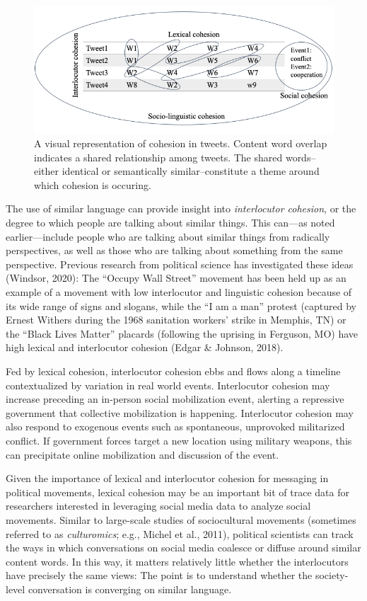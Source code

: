 \documentclass[english,man]{apa6}
\begin{document}
\begin{figure}
\includegraphics[width=1\linewidth]{./figs/cohesion-in-tweets} \caption{A visual representation of cohesion in tweets. Content word overlap indicates a shared relationship among tweets. The shared words--either identical or semantically similar--constitute a theme around which cohesion is occuring.}\label{fig:cohesion-in-tweets}
\end{figure}

The use of similar language can provide insight into \emph{interlocutor cohesion}, or
the degree to which people are talking about similar things. This can---as noted
earlier---include people who are talking about similar things from radically
perspectives, as well as those who are talking about something from the same
perspective. Previous research from political science has investigated these
ideas (Windsor, 2020): The \enquote{Occupy Wall Street} movement has been held up as an
example of a movement with low interlocutor and linguistic cohesion because of
its wide range of signs and slogans, while the \enquote{I am a man} protest (captured by
Ernest Withers during the 1968 sanitation workers' strike in Memphis, TN) or the
\enquote{Black Lives Matter} placards (following the uprising in Ferguson, MO) have high
lexical and interlocutor cohesion (Edgar \& Johnson, 2018).

Fed by lexical cohesion, interlocutor cohesion ebbs and flows along a timeline
contextualized by variation in real world events. Interlocutor cohesion may
increase preceding an in-person social mobilization event, alerting a repressive
government that collective mobilization is happening. Interlocutor cohesion may
also respond to exogenous events such as spontaneous, unprovoked militarized
conflict. If government forces target a new location using military weapons,
this can precipitate online mobilization and discussion of the event.

Given the importance of lexical and interlocutor cohesion for messaging in
political movements, lexical cohesion may be an important bit of trace data for
researchers interested in leveraging social media data to analyze social
movements. Similar to large-scale studies of sociocultural movements (sometimes
referred to as \emph{culturomics}; e.g., Michel et al., 2011), political
scientists can track the ways in which conversations on social media coalesce or
diffuse around similar content words. In this way, it matters relatively little
whether the interlocutors have precisely the same views: The point is to
understand whether the society-level conversation is converging on similar
language.
\end{document}
